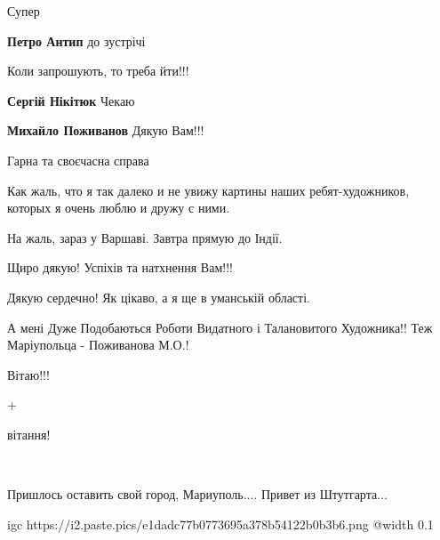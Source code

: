  
 
 
 
 

\qqSecCmt


Супер

\begin{itemize} %
\textbf{Петро Антип} до зустрічі
\end{itemize} %


Коли запрошують, то треба йти!!!

\begin{itemize} %
\textbf{Сергій Нікітюк} Чекаю

\textbf{Михайло Поживанов} Дякую Вам!!!
\end{itemize} %


Гарна та своєчасна справа


Как жаль, что я так далеко и не увижу картины наших ребят-художников, которых я
очень люблю и дружу с ними.


На жаль, зараз у Варшаві. Завтра прямую до Індії.


Щиро дякую! Успіхів та натхнення Вам!!!


Дякую сердечно!
Як цікаво, а я ще в уманській області.


А мені Дуже Подобаються Роботи Видатного і Талановитого Художника!! Теж
Маріупольца - Поживанова М.О.!💖💛💙


Вітаю!!!


+


вітання!


💙💛


Пришлось оставить свой город, Мариуполь.... Привет из Штутгарта...


\ifcmt
  igc https://i2.paste.pics/e1dadc77b0773695a378b54122b0b3b6.png
	@width 0.1
\fi
